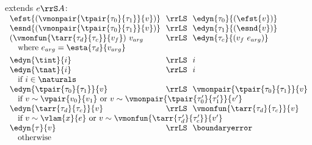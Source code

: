 \begin{flushleft}
\begin{minipage}[t]{\columnwidth}
 extends $e \rrS A$:\\
$\begin{array}{l@{~~}c@{~~}l}
  \efst{(\vmonpair{\tpair{\tau_0}{\tau_1}}{v})} & \rrLS & \edyn{\tau_0}{(\efst{v})}
\\
  \esnd{(\vmonpair{\tpair{\tau_0}{\tau_1}}{v})} & \rrLS & \edyn{\tau_1}{(\esnd{v})}
\\
  (\vmonfun{\tarr{\tau_d}{\tau_c}}{v_f})~v_{arg} & \rrLS & \edyn{\tau_c}{(v_f~e_{arg})}
\\ \multicolumn{3}{l}{\mbox{\quad where $e_{arg} = \esta{\tau_d}{v_{arg}}$}}
\\[0.8ex]
  \edyn{\tint}{i} & \rrLS & i
\\
  \edyn{\tnat}{i} & \rrLS & i
\\ \multicolumn{3}{l}{\mbox{\quad if $i \in \naturals$}}
\\
  \edyn{\tpair{\tau_0}{\tau_1}}{v} & \rrLS & \vmonpair{\tpair{\tau_0}{\tau_1}}{v}
\\ \multicolumn{3}{l}{\mbox{\quad if $v \sim \vpair{v_0}{v_1}$ or $v \sim \vmonpair{\tpair{\tau_0'}{\tau_1'}}{v'}$}}
\\
  \edyn{\tarr{\tau_d}{\tau_c}}{v} & \rrLS & \vmonfun{\tarr{\tau_d}{\tau_c}}{v}
\\ \multicolumn{3}{l}{\mbox{\quad if $v \sim \vlam{x}{e}$ or $v \sim \vmonfun{\tarr{\tau_d'}{\tau_c'}}{v'}$}}
\\
  \edyn{\tau}{v} & \rrLS & \boundaryerror
\\ \multicolumn{3}{l}{\mbox{\quad otherwise}}
\end{array}$
\end{minipage}

\end{flushleft}
